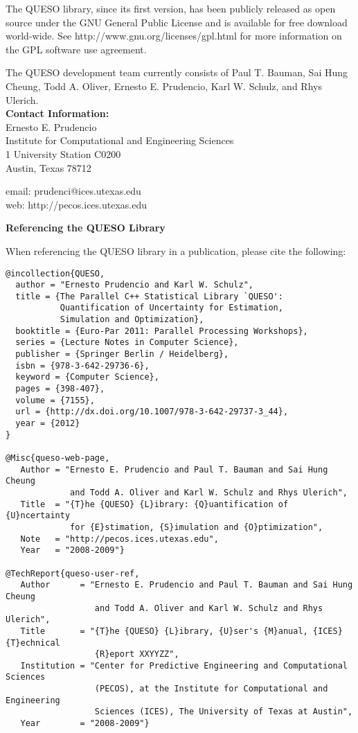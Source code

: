 The QUESO library, since its first version, has been publicly released as open source
under the GNU General Public License and is available for free download world-wide.
See http://www.gnu.org/licenses/gpl.html for more information on the GPL software use agreement.

The QUESO development team currently consists of
Paul T. Bauman,
Sai Hung Cheung,
Todd A. Oliver,
Ernesto E. Prudencio,
Karl W. Schulz, and
Rhys Ulerich.\\

{\bf Contact Information:}\\
Ernesto E. Prudencio\\
Institute for Computational and Engineering Sciences\\
1 University Station C0200\\
Austin, Texas 78712

email: prudenci@ices.utexas.edu\\
web: http://pecos.ices.utexas.edu\\
$~$\\

\centerline{\bf Referencing the QUESO Library}

When referencing the QUESO library in a publication, please cite the following:
\begin{verbatim}
@incollection{QUESO,
  author = "Ernesto Prudencio and Karl W. Schulz",
  title = {The Parallel C++ Statistical Library `QUESO':
           Quantification of Uncertainty for Estimation,
           Simulation and Optimization},
  booktitle = {Euro-Par 2011: Parallel Processing Workshops},
  series = {Lecture Notes in Computer Science},
  publisher = {Springer Berlin / Heidelberg},
  isbn = {978-3-642-29736-6},
  keyword = {Computer Science},
  pages = {398-407},
  volume = {7155},
  url = {http://dx.doi.org/10.1007/978-3-642-29737-3_44},
  year = {2012}
}

@Misc{queso-web-page,
   Author = "Ernesto E. Prudencio and Paul T. Bauman and Sai Hung Cheung
             and Todd A. Oliver and Karl W. Schulz and Rhys Ulerich",
   Title  = "{T}he {QUESO} {L}ibrary: {Q}uantification of {U}ncertainty
             for {E}stimation, {S}imulation and {O}ptimization",
   Note   = "http://pecos.ices.utexas.edu",
   Year   = "2008-2009"}

@TechReport{queso-user-ref,
   Author      = "Ernesto E. Prudencio and Paul T. Bauman and Sai Hung Cheung
                  and Todd A. Oliver and Karl W. Schulz and Rhys Ulerich",
   Title       = "{T}he {QUESO} {L}ibrary, {U}ser's {M}anual, {ICES} {T}echnical
                  {R}eport XXYYZZ",
   Institution = "Center for Predictive Engineering and Computational Sciences
                  (PECOS), at the Institute for Computational and Engineering
                  Sciences (ICES), The University of Texas at Austin",
   Year        = "2008-2009"}
\end{verbatim}
$~$\\
$~$\\

